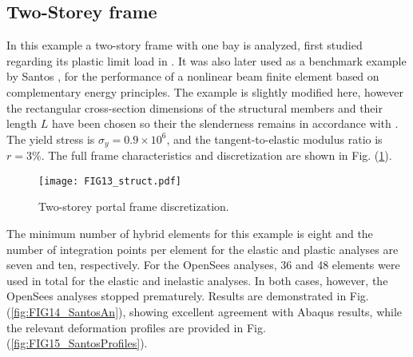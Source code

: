 \begin{figure*}[h]
	\centering
	\qquad
	\caption{Deformation profiles for Lee's frame with fixed supports.}%
	\label{fig:FIG12_LeesFixedProfiles}%
\end{figure*}

\clearpage
\begin{figure*}[t]
	\centering
	\qquad
	\caption{Geometrically nonlinear analyses of Lee's frame with fixed
		supports.}%
	\label{fig:FIG11_LeesFixed}%
\end{figure*}

\subsection{Two-Storey frame}

In this example a two-story frame with one bay is analyzed, first studied
regarding its plastic limit load in \cite{horne}. It was also later used as a
benchmark example by Santos \cite{Santos1}, for the performance of a nonlinear
beam finite element based on complementary energy principles. The example
is slightly modified here, however the rectangular cross-section
dimensions of the structural members and their length $L$ have been
chosen so their the slenderness remains in accordance with
\cite{Santos1}. The yield stress is $\sigma_y=0.9\times 10^6$, and the
tangent-to-elastic modulus ratio is $r=3\%$. The full frame
characteristics and discretization are shown in Fig. 
(\ref{fig:FIG13_santosStruct}).

\begin{figure}[t]
	\centering
	\texttt{[image: FIG13\_struct.pdf]}
	\caption{Two-storey portal frame discretization.}
	\label{fig:FIG13_santosStruct}
\end{figure}

The minimum number of hybrid elements for this example is eight and the number
of integration points per element for the elastic and plastic analyses are
seven and ten, respectively. For the OpenSees analyses, 36 and 48 elements
were used in total for the elastic and inelastic analyses. In both cases,
however, the OpenSees analyses stopped prematurely. Results are
demonstrated in Fig. (\ref{fig:FIG14_SantosAn}), showing excellent agreement 
with
Abaqus results, while the relevant deformation profiles are
provided in Fig. (\ref{fig:FIG15_SantosProfiles}).

